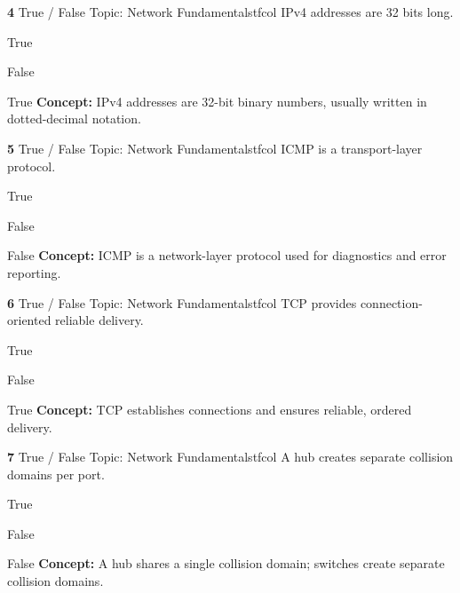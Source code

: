 \documentclass[10pt,a4paper]{article}
\begin{document}
\begin{qcard}{\color{white}\textbf{4} \hfill \small True / False \textbar{} Topic: Network Fundamentals}{tfcol}
IPv4 addresses are 32 bits long.

\begin{qoptions}
\item True
\item False
\end{qoptions}
\begin{explainbox}{True}
\textbf{Concept:} IPv4 addresses are 32-bit binary numbers, usually written in dotted-decimal notation.
\end{explainbox}
\end{qcard}

\begin{qcard}{\color{white}\textbf{5} \hfill \small True / False \textbar{} Topic: Network Fundamentals}{tfcol}
ICMP is a transport-layer protocol.

\begin{qoptions}
\item True
\item False
\end{qoptions}
\begin{explainbox}{False}
\textbf{Concept:} ICMP is a network-layer protocol used for diagnostics and error reporting.
\end{explainbox}
\end{qcard}

\begin{qcard}{\color{white}\textbf{6} \hfill \small True / False \textbar{} Topic: Network Fundamentals}{tfcol}
TCP provides connection-oriented reliable delivery.

\begin{qoptions}
\item True
\item False
\end{qoptions}
\begin{explainbox}{True}
\textbf{Concept:} TCP establishes connections and ensures reliable, ordered delivery.
\end{explainbox}
\end{qcard}

\begin{qcard}{\color{white}\textbf{7} \hfill \small True / False \textbar{} Topic: Network Fundamentals}{tfcol}
A hub creates separate collision domains per port.

\begin{qoptions}
\item True
\item False
\end{qoptions}
\begin{explainbox}{False}
\textbf{Concept:} A hub shares a single collision domain; switches create separate collision domains.
\end{explainbox}
\end{qcard}
\end{document}
